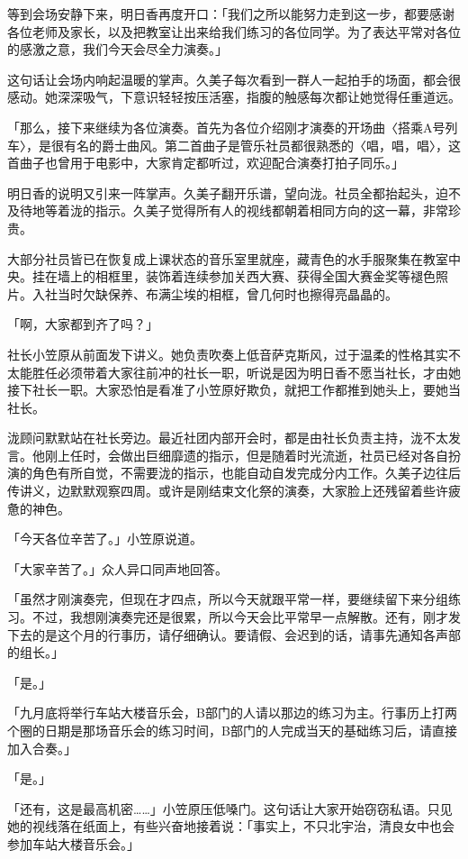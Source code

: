 \documentclass[UTF8]{ctexart}
\begin{document}
    等到会场安静下来，明日香再度开口：「我们之所以能努力走到这一步，都要感谢各位老师及家长，以及把教室让出来给我们练习的各位同学。为了表达平常对各位的感激之意，我们今天会尽全力演奏。」 

    这句话让会场内响起温暖的掌声。久美子每次看到一群人一起拍手的场面，都会很感动。她深深吸气，下意识轻轻按压活塞，指腹的触感每次都让她觉得任重道远。 

    「那么，接下来继续为各位演奏。首先为各位介绍刚才演奏的开场曲〈搭乘A号列车〉，是很有名的爵士曲风。第二首曲子是管乐社员都很熟悉的〈唱，唱，唱〉，这首曲子也曾用于电影中，大家肯定都听过，欢迎配合演奏打拍子同乐。」 

    明日香的说明又引来一阵掌声。久美子翻开乐谱，望向泷。社员全都抬起头，迫不及待地等着泷的指示。久美子觉得所有人的视线都朝着相同方向的这一幕，非常珍贵。 

    大部分社员皆已在恢复成上课状态的音乐室里就座，藏青色的水手服聚集在教室中央。挂在墙上的相框里，装饰着连续参加关西大赛、获得全国大赛金奖等褪色照片。入社当时欠缺保养、布满尘埃的相框，曾几何时也擦得亮晶晶的。 

    「啊，大家都到齐了吗？」 

    社长小笠原从前面发下讲义。她负责吹奏上低音萨克斯风，过于温柔的性格其实不太能胜任必须带着大家往前冲的社长一职，听说是因为明日香不愿当社长，才由她接下社长一职。大家恐怕是看准了小笠原好欺负，就把工作都推到她头上，要她当社长。 

    泷顾问默默站在社长旁边。最近社团内部开会时，都是由社长负责主持，泷不太发言。他刚上任时，会做出巨细靡遗的指示，但是随着时光流逝，社员已经对各自扮演的角色有所自觉，不需要泷的指示，也能自动自发完成分内工作。久美子边往后传讲义，边默默观察四周。或许是刚结束文化祭的演奏，大家脸上还残留着些许疲惫的神色。 

    「今天各位辛苦了。」小笠原说道。 

    「大家辛苦了。」众人异口同声地回答。 

    「虽然才刚演奏完，但现在才四点，所以今天就跟平常一样，要继续留下来分组练习。不过，我想刚演奏完还是很累，所以今天会比平常早一点解散。还有，刚才发下去的是这个月的行事历，请仔细确认。要请假、会迟到的话，请事先通知各声部的组长。」 

    「是。」 

    「九月底将举行车站大楼音乐会，B部门的人请以那边的练习为主。行事历上打两个圈的日期是那场音乐会的练习时间，B部门的人完成当天的基础练习后，请直接加入合奏。」 

    「是。」 

    「还有，这是最高机密……」小笠原压低嗓门。这句话让大家开始窃窃私语。只见她的视线落在纸面上，有些兴奋地接着说：「事实上，不只北宇治，清良女中也会参加车站大楼音乐会。」 
\end{document}
